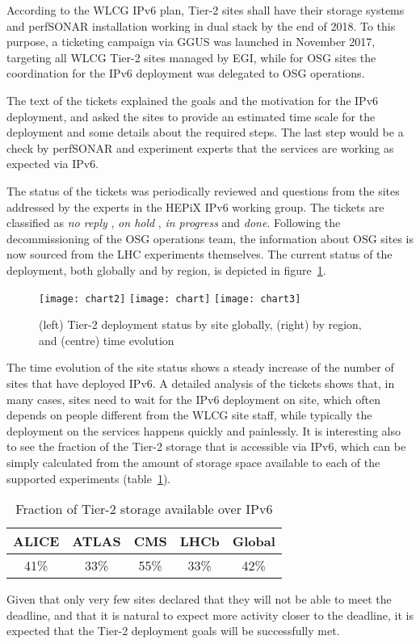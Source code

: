 According to the WLCG IPv6 plan, Tier-2 sites shall have
their storage systems and perfSONAR installation
working in dual stack by the end of 2018. To this purpose, a ticketing
campaign via GGUS was launched in November 2017, targeting all WLCG Tier-2
sites managed by EGI, while for OSG sites the coordination for the
IPv6 deployment was delegated to OSG operations.

The text of the tickets explained the goals and the motivation for the
IPv6 deployment, and asked the sites to provide an estimated time
scale for the deployment and some details about the required
steps. The last step would be a check by perfSONAR and experiment
experts that the services are working as expected via IPv6.

The status of the tickets was periodically reviewed and questions from
the sites addressed by the experts in the HEPiX IPv6 working
group. The tickets are classified as {\it no reply} 
, {\it on hold} 
, {\it in progress} 
and {\it done}.
Following the decommissioning of the OSG operations team, the
information about OSG sites is now sourced from the LHC experiments
themselves. The current status of the deployment, both globally and by
region, is depicted in figure~\ref{fig:t2depl}.
\begin{figure}[t]
\centering
\texttt{[image: chart2]}
\texttt{[image: chart]}
\texttt{[image: chart3]}
\caption{(left) Tier-2 deployment status by site globally, (right) by region, and (centre) time evolution}
\label{fig:t2depl}
\end{figure}

The time evolution of the site status shows a steady increase of the
number of sites that have deployed IPv6. A detailed analysis of the
tickets shows that, in many cases, sites need to wait for the IPv6
deployment on site, which often depends on people different from the
WLCG site staff, while typically the deployment on the services
happens quickly and painlessly. It is interesting also to see the
fraction of the Tier-2 storage that is accessible via IPv6, which can
be simply calculated from the amount of storage space available to
each of the supported experiments (table~\ref{tab:t2stor}).
\begin{table}[h]
\centering
\caption{Fraction of Tier-2 storage available over IPv6}
\label{tab:t2stor}
\begin{tabular}{ccccc}
\hline
ALICE & ATLAS & CMS & LHCb & Global \\\hline
41\% & 33\% & 55\% & 33\% & 42\% \\\hline
\end{tabular}
\end{table}
Given that only very few sites declared that they will not be able to
meet the deadline, and that it is natural to expect more activity closer to
the deadline, it is expected that the Tier-2 deployment
goals will be successfully met.
